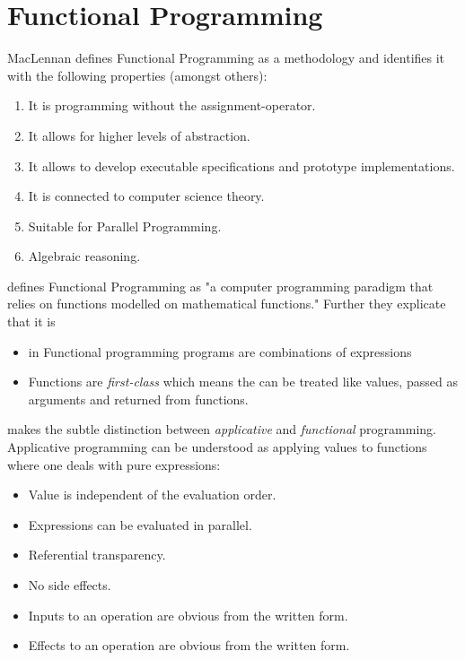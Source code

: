 \chapter{Functional Programming}
\label{ch:fp}

MacLennan \cite{maclennan_functional_1990} defines Functional Programming as a methodology and identifies it with the following properties (amongst others):

\begin{enumerate}
	\item It is programming without the assignment-operator.
	\item It allows for higher levels of abstraction.
	\item It allows to develop executable specifications and prototype implementations.
	\item It is connected to computer science theory.
	\item Suitable for Parallel Programming.
	\item Algebraic reasoning.
\end{enumerate}

\cite{allen_haskell_2016} defines Functional Programming as "a computer programming paradigm that relies on functions modelled on mathematical functions." Further they explicate that it is 
\begin{itemize}
	\item in Functional programming programs are combinations of expressions
	\item Functions are \textit{first-class} which means the can be treated like values, passed as arguments and returned from functions.
\end{itemize}

\cite{maclennan_functional_1990} makes the subtle distinction between \textit{applicative} and \textit{functional} programming. Applicative programming can be understood as applying values to functions where one deals with pure expressions:

\begin{itemize}
	\item Value is independent of the evaluation order.
	\item Expressions can be evaluated in parallel.
	\item Referential transparency.
	\item No side effects.
	\item Inputs to an operation are obvious from the written form.
	\item Effects to an operation are obvious from the written form.
\end{itemize}

